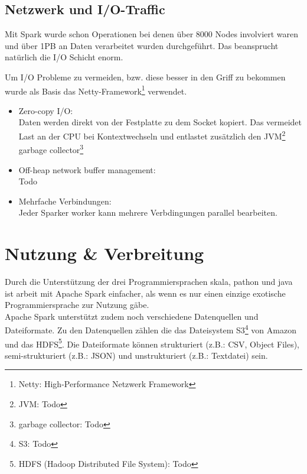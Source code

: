 \subsection{Netzwerk und I/O-Traffic}

Mit Spark wurde schon Operationen bei denen über 8000 Nodes involviert waren und über 1PB an Daten verarbeitet wurden durchgeführt.
Das beansprucht natürlich die I/O Schicht enorm. 


Um I/O Probleme zu vermeiden, bzw. diese besser in den Griff zu bekommen wurde als Basis das Netty-Framework\footnote{Netty: High-Performance Netzwerk Framework} verwendet.
\begin{itemize}
	\item Zero-copy I/O:\\
	Daten werden direkt von der Festplatte zu dem Socket kopiert. Das vermeidet Last an der CPU bei Kontextwechseln und entlastet zusätzlich den JVM\footnote{JVM: Todo} garbage collector\footnote{garbage collector: Todo}
	\item Off-heap network buffer management:\\
	Todo
	\item Mehrfache Verbindungen:\\
	Jeder Sparker worker kann mehrere Verbdingungen parallel bearbeiten.
\end{itemize}


\newpage
\section{Nutzung \& Verbreitung}

Durch die Unterstützung der drei Programmiersprachen skala, pathon und java ist arbeit mit Apache Spark einfacher, als wenn es nur einen einzige exotische Programmiersprache zur Nutzung gäbe. \\
Apache Spark unterstützt zudem noch verschiedene Datenquellen und Dateiformate.  Zu den Datenquellen zählen die das Dateisystem S3\footnote{S3: Todo} von Amazon und das HDFS\footnote{HDFS (Hadoop Distributed File System): Todo}.
Die Dateiformate können strukturiert (z.B.: CSV, Object Files), semi-strukturiert (z.B.: JSON) und unstrukturiert (z.B.: Textdatei) sein.


